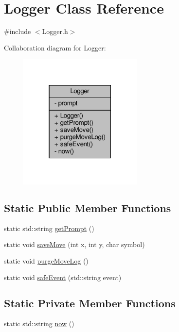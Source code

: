 \hypertarget{classLogger}{}\section{Logger Class Reference}
\label{classLogger}


{\ttfamily \#include $<$Logger.\+h$>$}



Collaboration diagram for Logger\+:
\nopagebreak
\begin{figure}[H]
\begin{center}
\leavevmode
\includegraphics[width=175pt]{classLogger__coll__graph}
\end{center}
\end{figure}
\subsection*{Static Public Member Functions}
\begin{DoxyCompactItemize}
\item 
static std\+::string \hyperlink{classLogger_a4004f551a3c44ceb479c7c36e4e1dee8}{get\+Prompt} ()
\item 
static void \hyperlink{classLogger_a1e920507694b06e8a16120783902e229}{save\+Move} (int x, int y, char symbol)
\item 
static void \hyperlink{classLogger_a69ca833f3e3643333d718f0cce464f9b}{purge\+Move\+Log} ()
\item 
static void \hyperlink{classLogger_ad2156c976610010c579352c9aeb4b388}{safe\+Event} (std\+::string event)
\end{DoxyCompactItemize}
\subsection*{Static Private Member Functions}
\begin{DoxyCompactItemize}
\item 
static std\+::string \hyperlink{classLogger_a756a608050fea9f497dd2736f9321f3b}{now} ()
\end{DoxyCompactItemize}
